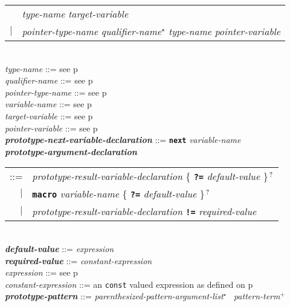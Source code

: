 \documentclass[12pt]{article}
\newcommand{\TT}[1]{{\tt \bfseries #1}}
\newcommand{\STAR}{{\Large $^\star$}}
\newcommand{\PLUS}[1][]{{$^{+#1}$}}
\newcommand{\QMARK}{{$^{\,\mbox{\footnotesize ?}}$}}
\newcommand{\ttkey}[1]{{\tt \bfseries #1}}
\newcommand{\emkey}[1]{{\em \bfseries #1}}
\newcommand{\pagref}[1]{p\pageref{#1}}
\newenvironment{indpar}[1][0.3in]%
	{\begin{list}{}%
		     {\setlength{\itemsep}{0in}%
		      \setlength{\topsep}{0in}%
		      \setlength{\parsep}{1ex}%
		      \setlength{\labelwidth}{#1}%
		      \setlength{\leftmargin}{#1}%
		      \addtolength{\leftmargin}{\labelsep}}%
	 \item}%
	{\end{list}}
\begin{document}
\begin{indpar}[0.1in]
\hspace*{0.5in}\begin{tabular}{rl}
	    & {\em type-name} {\em target-variable} \\
	$|$ & {\em pointer-type-name} {\em qualifier-name}\STAR{}
	      {\em type-name} {\em pointer-variable}
	\end{tabular}
\\[0.5ex]
{\em type-name} ::= see \pagref{TYPE-NAME}
\\[0.5ex]
{\em qualifier-name} ::= see \pagref{QUALIFIER-NAME}
\\[0.5ex]
{\em pointer-type-name} ::= see \pagref{POINTER-TYPE-NAME}
\\[0.5ex]
{\em variable-name} ::= see \pagref{VARIABLE-NAME}
\\[0.5ex]
{\em target-variable} ::= see \pagref{TARGET-VARIABLE}
\\[0.5ex]
{\em pointer-variable} ::= see \pagref{POINTER-VARIABLE}
\\[0.5ex]
\emkey{prototype-next-variable-declaration}%
    \label{PROTOTYPE-NEXT-VARIABLE-DECLARATION}
      ::= \ttkey{next} {\em variable-name}
\\[0.5ex]
\emkey{prototype-argument-declaration}\label{PROTOTYPE-ARGUMENT-DECLARATION} \\
\hspace*{0.5in}\begin{tabular}[t]{@{}rl@{}}
    ::= & {\em prototype-result-variable-declaration}
          \{ \TT{?=} {\em default-value} \}\QMARK{} \\
    $|$ & \TT{macro} {\em variable-name}
          \{ \TT{?=} {\em default-value} \}\QMARK{} \\
    $|$ & {\em prototype-result-variable-declaration}
          \TT{!=} {\em required-value} \\
    \end{tabular}
\\[0.5ex]
\emkey{default-value} ::= {\em expression}
\\[0.5ex]
\emkey{required-value} ::= {\em constant-expression}
\\[0.5ex]
{\em expression} ::= see \pagref{EXPRESSION}
\\[0.5ex]
{\em constant-expression} ::= an {\tt const} valued expression as
    defined on \pagref{CONSTANT-EXPRESSION}
\\[0.5ex]
\emkey{prototype-pattern}\label{PROTOTYPE-PATTERN}
    ::= {\em parenthesized-pattern-argument-list}\STAR{}~
        {\em pattern-term}\PLUS{}
\\[0.5ex]

\end{indpar}
\end{document}
